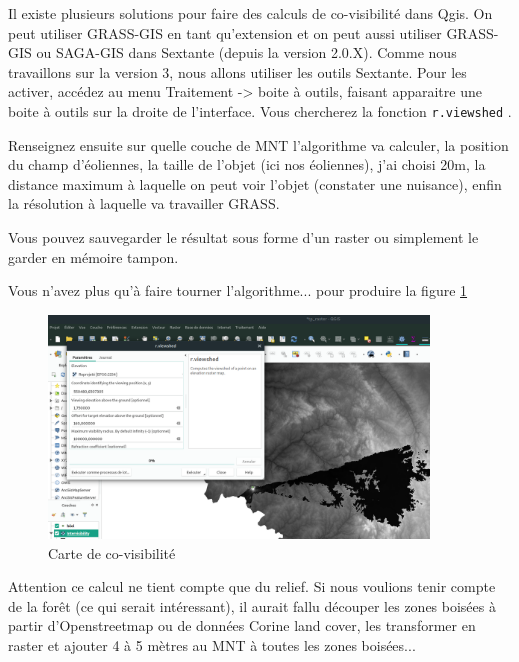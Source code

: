 \documentclass[a4paper, 11pt]{article}
\begin{document}
    Il existe plusieurs solutions pour faire des calculs de co-visibilité dans Qgis. On peut utiliser GRASS-GIS en tant qu'extension et on peut aussi utiliser GRASS-GIS ou SAGA-GIS dans Sextante (depuis la version 2.0.X). Comme nous travaillons sur la version 3, nous allons utiliser les outils Sextante. Pour les activer, accédez au menu Traitement -> boite à outils, faisant apparaitre une boite à outils sur la droite de l'interface. Vous chercherez la fonction \texttt{r.viewshed} .

    Renseignez ensuite sur quelle couche de MNT l'algorithme va calculer,  la position du champ d'éoliennes, la taille de l'objet (ici nos éoliennes), j'ai choisi 20m, la distance maximum à laquelle on peut voir l'objet (constater une nuisance), enfin la résolution à laquelle va travailler GRASS.

    Vous pouvez sauvegarder le résultat sous forme d'un raster ou simplement le garder en mémoire tampon.

    Vous n'avez plus qu'à faire tourner l'algorithme... pour produire la figure \ref{fig:carte_limousin_covisibilite}

    \begin{figure}
    \centering
    \includegraphics[width=0.9\textwidth]{img/rViewshed}
      \caption{Carte de co-visibilité}\label{fig:carte_limousin_covisibilite}
    \end{figure}

    Attention ce calcul ne tient compte que du relief. Si nous voulions tenir compte de la forêt (ce qui serait intéressant), il aurait fallu découper les zones boisées à partir d'Openstreetmap ou de données Corine land cover, les transformer en raster et ajouter 4 à 5 mètres au MNT à toutes les zones boisées...
\end{document}
